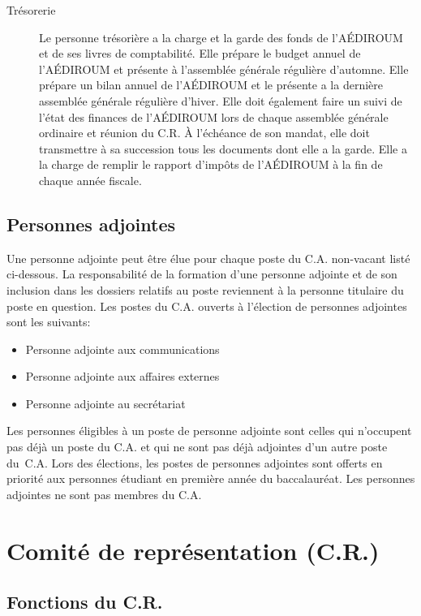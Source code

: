\documentclass{aediroum}
\begin{document}
\begin{description}
    \item[Trésorerie]
        Le personne trésorière a la charge et la garde des fonds de l'AÉDIROUM et de ses livres de comptabilité.
        Elle prépare le budget annuel de l'AÉDIROUM et présente à l'assemblée générale régulière d'automne.
        Elle prépare un bilan annuel de l'AÉDIROUM et le présente a la dernière assemblée générale régulière d'hiver.
        Elle doit également faire un suivi de l'état des finances de l'AÉDIROUM lors de chaque assemblée générale ordinaire et réunion du C.R.
        À l'échéance de son mandat, elle doit transmettre à sa succession tous les documents dont elle a la garde.
        Elle a la charge de remplir le rapport d'impôts de l'AÉDIROUM à la fin de chaque année fiscale.
\end{description}

\subsection{Personnes adjointes}\label{sec:adjoints}

Une personne adjointe peut être élue pour chaque poste du C.A. non-vacant listé ci-dessous. La responsabilité de la formation d’une personne adjointe et de son inclusion dans les dossiers relatifs au poste reviennent à la personne titulaire du poste en question. Les postes du C.A. ouverts à l’élection de personnes adjointes sont les suivants:

\begin{itemize}
    \item Personne adjointe aux communications
    \item Personne adjointe aux affaires externes
    \item Personne adjointe au secrétariat
\end{itemize}

Les personnes éligibles à un poste de personne adjointe sont celles qui n’occupent pas déjà un poste du C.A. et qui ne sont pas déjà adjointes d’un autre poste du~C.A.
Lors des élections, les postes de personnes adjointes sont offerts en priorité aux personnes étudiant en première année du baccalauréat.
Les personnes adjointes ne sont pas membres du C.A.

\section{Comité de représentation (C.R.)}

\subsection{Fonctions du C.R.}
\end{document}
